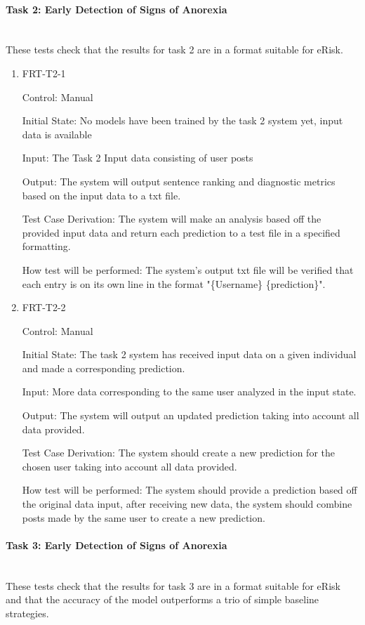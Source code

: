 \documentclass[12pt, titlepage]{article}
\newcommand{\myparagraph}[1]{\paragraph{#1}\mbox{}\\}
\begin{document}
\myparagraph{Task 2: Early Detection of Signs of Anorexia}

These tests check that the results for task 2 are in a format suitable for eRisk.

\begin{enumerate}

\item{FRT-T2-1\\}

Control: Manual

Initial State: No models have been trained by the task 2 system yet, input data is available

Input: The Task 2 Input data consisting of user posts

Output: The system will output sentence ranking and diagnostic metrics based on the input data to a txt file.

Test Case Derivation: The system will make an analysis based off the provided input data and return each prediction to a test file in a specified formatting.

How test will be performed: The system's output txt file will be verified that each entry is on its own line in the format "\{Username\} \{prediction\}".

\item{FRT-T2-2\\}

Control: Manual

Initial State: The task 2 system has received input data on a given individual and made a corresponding prediction.

Input: More data corresponding to the same user analyzed in the input state.

Output: The system will output an updated prediction taking into account all data provided.

Test Case Derivation: The system should create a new prediction for the chosen user taking into account all data provided.

How test will be performed: The system should provide a prediction based off the original data input, after receiving new data, the system should combine posts made by the same user to create a new prediction.

\end{enumerate}

\myparagraph{Task 3: Early Detection of Signs of Anorexia}

These tests check that the results for task 3 are in a format suitable for eRisk and that the accuracy of the model outperforms a trio of simple baseline strategies.
\end{document}
